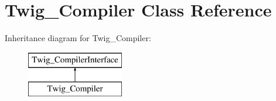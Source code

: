\hypertarget{class_twig___compiler}{}\section{Twig\+\_\+\+Compiler Class Reference}
\label{class_twig___compiler}
Inheritance diagram for Twig\+\_\+\+Compiler\+:\begin{figure}[H]
\begin{center}
\leavevmode
\includegraphics[height=2.000000cm]{class_twig___compiler}
\end{center}
\end{figure}
